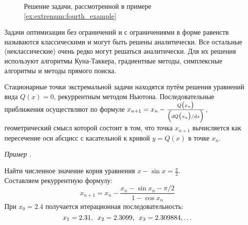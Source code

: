 \documentclass[preprint,russian,a5paper,10pt,twoside,mediummath]{ncc}
\newcommand{\ExampleMy}{\vspace{\baselineskip}\textbf{\underline{Пример:}}\nopagebreak\par}
\newcounter{problem}[section]				%
\renewcommand{\theproblem}{\thesection.\arabic{problem}}		%
\newenvironment{problem}[1][]%
	{\par \refstepcounter{problem} \begin{flushright} \textit{Пример \theproblem} \end{flushright} \vspace{-\baselineskip} #1 \begin{oframed}}%
	{\par \end{oframed}}%
\begin{document}


\begin{figure}[ht] \centering
{}
\footnotesize \caption{Решение задачи, рассмотренной в примере \ref{ex:extremum:fourth_example} \label{fig:extremum:fourth_example}}
\end{figure}

Задачи оптимизации без ограничений и с ограничениями в форме равенств называются классическими и могут быть решены аналитически. Все остальные (неклассические) очень редко могут решаться аналитически. Для их решения используют алгоритмы Куна-Таккера, градиентные методы, симплексные алгоритмы и методы прямого поиска.

Стационарные точки экстремальной задачи находятся путём решения уравнений вида $ Q(x) = 0 $, рекуррентным методом Ньютона. Последовательные приближения осуществляют по формуле $ x_{n+1} = x_n - \frac{ Q \bigl( x_n \bigr) }{ \Bigl(  dQ \bigl( x_n \bigr) / dx \Bigr) } $, геометрический смысл которой состоит в том, что точка $ x_{n+1} $ вычисляется как пересечение оси абсцисс с касательной к кривой $ y = Q(x) $ в точке $ x_n $.


\begin{problem}
Найти численное значение корня уравнения $ x - \sin x = \frac{ \pi }{2} $.\\
Составляем рекуррентную формулу:
\[ x_{n+1} = x_n - \frac{ x_n - \sin x_n - \pi/2}{ 1 - \cos x_n } \]
При ${{x}_{0}}=2.4$ получается итерационная последовательность:
\[ x_1 = 2.31, \enskip x_2 = 2.3099, \enskip x_3 = 2.309884, \ldots \]
\end{problem}
\end{document}
